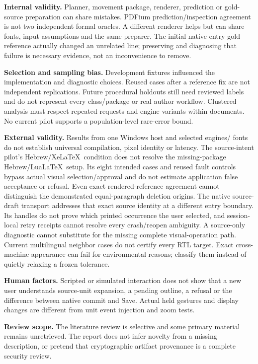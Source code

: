 \textbf{Internal validity.} Planner, movement package, renderer, prediction or
gold-source preparation can share mistakes. PDFium prediction/inspection
agreement is not two independent formal oracles. A different renderer helps
but can share fonts, input assumptions and the same preparer. The initial
native-entry gold reference actually changed an unrelated line; preserving and
diagnosing that failure is necessary evidence, not an inconvenience to remove.

\textbf{Selection and sampling bias.} Development fixtures influenced the
implementation and diagnostic choices. Reused cases after a reference fix are
not independent replications. Future procedural holdouts still need reviewed
labels and do not represent every class/package or real author workflow.
Clustered analysis must respect repeated requests and engine variants within
documents. No current pilot supports a population-level rare-error bound.

\textbf{External validity.} Results from one Windows host and selected engines/
fonts do not establish universal compilation, pixel identity or latency.
The source-intent pilot's Hebrew/Xe\LaTeX\ condition does not resolve the
missing-package Hebrew/Lua\LaTeX\ setup. Its eight intended cases and reused
fault controls bypass actual visual selection/approval and do not estimate
application false acceptance or refusal. Even exact rendered-reference agreement
cannot distinguish the demonstrated equal-paragraph deletion origins.
The native source-draft transport addresses that exact source identity at a
different entry boundary. Its handles do not prove which printed occurrence
the user selected, and session-local retry receipts cannot resolve every
crash/reopen ambiguity. A source-only diagnostic cannot substitute for the
missing complete visual-operation path.
Current multilingual neighbor cases do not certify every RTL target. Exact
cross-machine appearance can fail for environmental reasons; classify them
instead of quietly relaxing a frozen tolerance.

\textbf{Human factors.} Scripted or simulated interaction does not show that a
new user understands source-unit expansion, a pending outline, a refusal or
the difference between native commit and Save. Actual held gestures and display
changes are different from unit event injection and zoom tests.

\textbf{Review scope.} The literature review is selective and some primary
material remains unretrieved. The report does not infer novelty from a missing
description, or pretend that cryptographic artifact provenance is a complete
security review.

